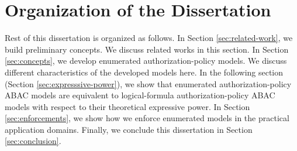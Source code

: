 \section{Organization of the Dissertation}
Rest of this dissertation is organized as follows. In Section \ref{sec:related-work}, we build preliminary concepts. We discuss related works in this section. In Section \ref{sec:concepts}, we develop enumerated authorization-policy models. We discuss different characteristics of the developed models here. In the following section (Section \ref{sec:expresssive-power}), we show that enumerated authorization-policy ABAC models are equivalent to logical-formula authorization-policy ABAC models with respect to their theoretical expressive power. In Section \ref{sec:enforcements}, we show how we enforce enumerated models in the practical application domains. Finally, we conclude this dissertation in Section \ref{sec:conclusion}.

